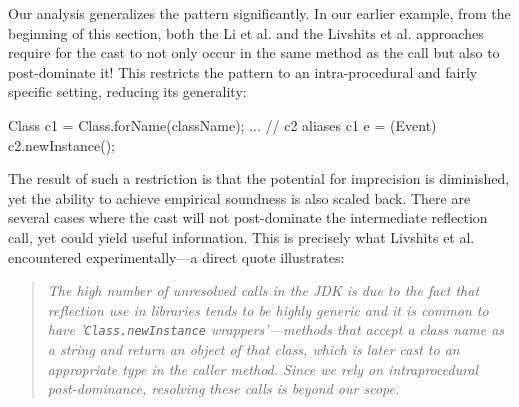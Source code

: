 \begin{compactitem}
\item Our analysis generalizes the pattern significantly. In our
  earlier example, from the beginning of this section, both the Li et
  al. and the Livshits et al. approaches require for the cast to not
  only occur in the same method as the  call but
  also to post-dominate it!  This restricts the pattern to an
  intra-procedural and fairly specific setting, reducing its
  generality:
  
  \begin{javacodelinum}
    Class c1 = Class.forName(className);
    ...      // c2 aliases c1
    e = (Event) c2.newInstance(); 
  \end{javacodelinum}

  The result of such a restriction is that the potential for
  imprecision is diminished, yet the ability to achieve empirical
  soundness is also scaled back. There are several cases where the
  cast will not post-dominate the intermediate reflection call, yet
  could yield useful information.  This is precisely what Livshits et
  al. encountered experimentally---a direct quote illustrates:

  \begin{quote}
    \emph{The high number of unresolved calls in the JDK is due to the
      fact that reflection use in libraries tends to be highly generic
      and it is common to have '\texttt{\small{Class.newInstance}}
      wrappers'---methods that accept a class name as a string and
      return an object of that class, which is later cast to an
      appropriate type in the caller method. Since we rely on
      intraprocedural post-dominance, resolving these calls is beyond
      our scope.}~\cite{aplas/LivshitsWL05}
  \end{quote}



\end{compactitem}
